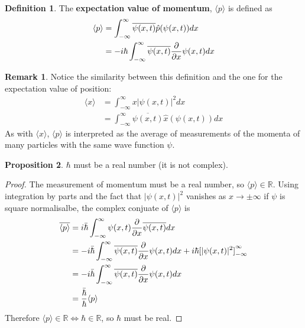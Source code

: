 \documentclass[12pt,a4paper]{article}
\theoremstyle{definition}
\newtheorem{definition}{Definition}[subsection]
\newtheorem{proposition}[definition]{Proposition}
\newtheorem*{remark}{Remark}
\begin{document}
\begin{definition}
	The \textbf{expectation value of momentum}, $\langle p \rangle$ is defined as
	\[
		\begin{aligned}
			\langle p \rangle
				& = \int_{-\infty}^{\infty} \overline{\psi(x, t)} \hat{p} (\psi(x, t)) dx \\
				& = -i \hbar \int_{-\infty}^{\infty} \overline{\psi(x, t)} \diffp{}{x} \psi(x, t) dx
		\end{aligned}
	\]
\end{definition}

\begin{remark}
	Notice the similarity between this definition and the one for the expectation value of position:
	\[
		\begin{aligned}
			\langle x \rangle
				& = \int_{-\infty}^{\infty} x |\psi(x, t)|^2 dx \\
				& = \int_{-\infty}^{\infty} \overline{\psi(x, t)} \hat{x} (\psi(x, t)) dx
		\end{aligned}
	\]
	As with $\langle x \rangle$, $\langle p \rangle$ is interpreted as the average of measurements of the momenta of many particles with the same wave function $\psi$.
\end{remark}

\begin{proposition}
	$\hbar$ must be a real number (it is not complex).
\end{proposition}

\begin{proof}
	The measurement of momentum must be a real number, so $\langle p \rangle \in \mathbb{R}$. Using integration by parts and the fact that $|\psi(x, t)|^2$ vanishes as $x \rightarrow \pm \infty$ if $\psi$ is square normalisalbe, the complex conjuate of $\langle p \rangle$ is
	\[
		\begin{aligned}
			\overline{\langle p \rangle}
				& = i \bar{\hbar} \int_{-\infty}^{\infty} \psi(x, t) \diffp{}{x} \overline{\psi(x, t)} dx \\
				& = -i \bar{\hbar} \int_{-\infty}^{\infty} \overline{\psi(x, t)} \diffp{}{x} \psi(x, t) dx + i \hbar {[|\psi(x, t)|^2]}_{-\infty}^{\infty} \\
				& = -i \bar{\hbar} \int_{-\infty}^{\infty} \overline{\psi(x, t)} \diffp{}{x} \psi(x, t) dx \\
				& = \frac{\bar{\hbar}}{\hbar} \langle p \rangle
		\end{aligned}
	\]
	Therefore $\langle p \rangle \in \mathbb{R} \Longleftrightarrow \hbar \in \mathbb{R}$, so $\hbar$ must be real.
\end{proof}
\end{document}
